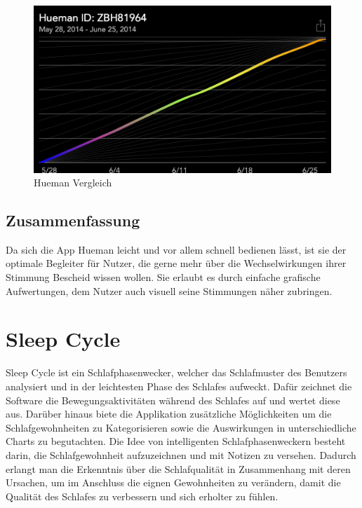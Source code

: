 \begin{figure}[h]
\centering
\includegraphics[scale=0.3]{images/hueman-matched-data.PNG}
\caption{Hueman Vergleich \cite{fig:Vergleich}}
\label{fig:Vergleich}
\end{figure}


\subsection{Zusammenfassung}
\label{ch:Apps:sec:Hueman:subsec:Verdict}

Da sich die App Hueman leicht und vor allem schnell bedienen lässt, ist sie der optimale Begleiter für Nutzer, die gerne mehr über die Wechselwirkungen ihrer Stimmung Bescheid wissen wollen.
Sie erlaubt es durch einfache grafische Aufwertungen, dem Nutzer auch visuell seine Stimmungen näher zubringen.  


\section{Sleep Cycle}
\label{ch:Apps:sec:SleepCycle}

Sleep Cycle ist ein Schlafphasenwecker, welcher das Schlafmuster des Benutzers analysiert und in der leichtesten Phase des Schlafes aufweckt. \cite{web:SleepCycle}
Dafür zeichnet die Software die Bewegungsaktivitäten während des Schlafes auf und wertet diese aus.
Darüber hinaus biete die Applikation zusätzliche Möglichkeiten um die Schlafgewohnheiten zu Kategorisieren sowie die Auswirkungen in unterschiedliche Charts zu begutachten. 
Die Idee von intelligenten Schlafphasenweckern besteht darin, die Schlafgewohnheit aufzuzeichnen und mit Notizen zu versehen. Dadurch erlangt man die Erkenntnis über die Schlafqualität in Zusammenhang mit deren Ursachen, um im Anschluss die eignen Gewohnheiten zu verändern, damit die Qualität des Schlafes zu verbessern und sich erholter zu fühlen.

